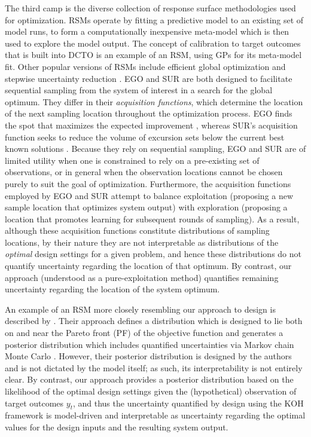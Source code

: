 \documentclass[12pt]{article}
\begin{document}
%
The third camp is the diverse collection of response surface methodologies  \citep[RSMs;][]{Dean2017} used for optimization.
%
RSMs operate by fitting a predictive model to an existing set of model runs, to form a computationally inexpensive meta-model which is then used to explore the model output.
%
The concept of calibration to target outcomes that is built into DCTO is an example of an RSM, using GPs for its meta-model fit.
%
Other popular versions of RSMs include efficient global optimization \citep[EGO;][]{Jones1998,Brochu2010} and stepwise uncertainty reduction \citep[SUR;][]{Geman1996,Villemonteix2009,Chevalier2014,Picheny2015,MiguelHernandez-Lobato2016,Picheny2019,Binois2019}.
%
EGO and SUR are both designed to facilitate sequential sampling from the system of interest in a search for the global optimum.
%
They differ in their \textit{acquisition functions}, which determine the location of the next sampling location throughout the optimization process.
%
EGO finds the spot that maximizes the expected improvement \citep{Mockus1978,Jones1998}, whereas SUR's acquisition function seeks to reduce the volume of excursion sets below the current best known solutions \citep{Chevalier2014}.
%
Because they rely on sequential sampling, EGO and SUR are of limited utility when one is constrained to rely on a pre-existing set of observations, or in general when the observation locations cannot be chosen purely to suit the goal of optimization.
%
Furthermore, the acquisition functions employed by EGO and SUR attempt to balance exploitation (proposing a new sample location that optimizes system output) with exploration (proposing a location that promotes learning for subsequent rounds of sampling).
%
As a result, although these acquisition functions constitute distributions of sampling locations, by their nature they are not interpretable as distributions of the \textit{optimal} design settings for a given problem, and hence these distributions do not quantify uncertainty regarding the location of that optimum.
%
By contrast, our approach (understood as a pure-exploitation method) quantifies remaining uncertainty regarding the location of the system optimum.
%

%
An example of an RSM more closely resembling our approach to design is described by \cite{Olalotiti-Lawal2015}.
%
Their approach defines a distribution which is designed to lie both on and near the Pareto front (PF) of the objective function and generates a posterior distribution which includes quantified uncertainties via Markov chain Monte Carlo \citep[MCMC;][]{Gelfand1990}.
%
However, their posterior distribution is designed by the authors and is not dictated by the model itself; as such, its interpretability is not entirely clear.
%
By contrast, our approach provides a posterior distribution based on the likelihood of the optimal design settings given the (hypothetical) observation of target outcomes $y_t$, and thus the uncertainty quantified by design using the KOH framework is model-driven and interpretable as uncertainty regarding the optimal values for the design inputs and the resulting system output.
%
\end{document}
